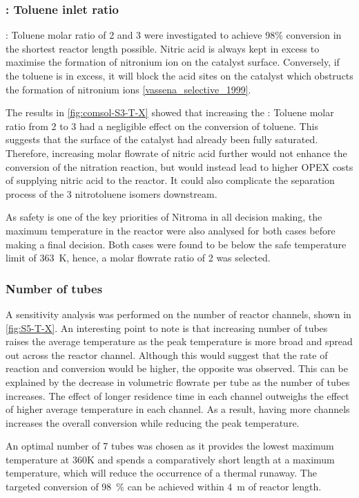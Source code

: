 \subsubsection{ : Toluene inlet ratio}

 : Toluene molar ratio of 2 and 3 were investigated to achieve 98\% conversion in the shortest reactor length possible. Nitric acid is always kept in excess to maximise the formation of nitronium ion on the catalyst surface. Conversely, if the toluene is in excess, it will block the acid sites on the catalyst which obstructs the formation of nitronium ions \ref{vassena_selective_1999}.

The results in \cref{fig:comsol-S3-T-X} showed that increasing the  : Toluene molar ratio from 2 to 3 had a negligible effect on the conversion of toluene. This suggests that the surface of the catalyst had already been fully saturated. Therefore, increasing molar flowrate of nitric acid further would not enhance the conversion of the nitration reaction, but would instead lead to higher OPEX costs of supplying nitric acid to the reactor. It could also complicate the separation process of the 3 nitrotoluene isomers downstream. 

As safety is one of the key priorities of Nitroma in all decision making, the maximum temperature in the reactor were also analysed for both cases before making a final decision. Both cases were found to be below the safe temperature limit of \SI{363}{\K}, hence, a molar flowrate ratio of 2 was selected.

\subsubsection{Number of tubes}
A sensitivity analysis was performed on the number of reactor channels, shown in \cref{fig:S5-T-X}. An interesting point to note is that increasing number of tubes raises the average temperature as the peak temperature is more broad and spread out across the reactor channel. Although this would suggest that the rate of reaction and conversion would be higher, the opposite was observed. This can be explained by the decrease in volumetric flowrate per tube as the number of tubes increases. The effect of longer residence time in each channel outweighs the effect of higher average temperature in each channel. As a result, having more channels increases the overall conversion while reducing the peak temperature.

An optimal number of 7 tubes was chosen as it provides the lowest maximum temperature at 360K and spends a comparatively short length at a maximum temperature, which will reduce the occurrence of a thermal runaway. The targeted conversion of \SI{98}{\percent} can be achieved within \SI{4}{\metre} of reactor length. 

